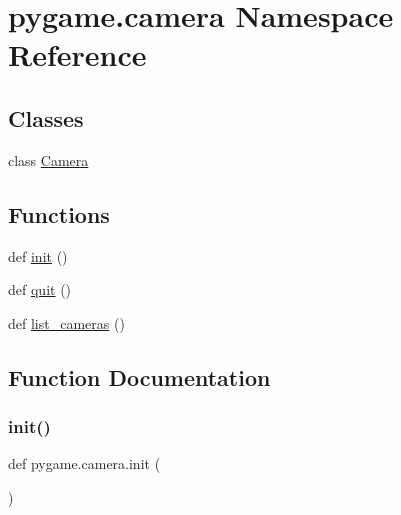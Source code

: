 \hypertarget{namespacepygame_1_1camera}{}\section{pygame.\+camera Namespace Reference}
\label{namespacepygame_1_1camera}
\subsection*{Classes}
\begin{DoxyCompactItemize}
\item 
class \hyperlink{classpygame_1_1camera_1_1_camera}{Camera}
\end{DoxyCompactItemize}
\subsection*{Functions}
\begin{DoxyCompactItemize}
\item 
def \hyperlink{namespacepygame_1_1camera_a3752238e984dca15aaa76c804c986300}{init} ()
\item 
def \hyperlink{namespacepygame_1_1camera_afc39f9eaf33103f88ec2372d1733add1}{quit} ()
\item 
def \hyperlink{namespacepygame_1_1camera_a16cd4b9a65c3e3aa868f6afb7aa410d5}{list\+\_\+cameras} ()
\end{DoxyCompactItemize}


\subsection{Function Documentation}
\mbox{\label{namespacepygame_1_1camera_a3752238e984dca15aaa76c804c986300}} 
\subsubsection{\texorpdfstring{init()}{init()}}
{\footnotesize\ttfamily def pygame.\+camera.\+init (\begin{DoxyParamCaption}{ }\end{DoxyParamCaption})}

\mbox{\label{namespacepygame_1_1camera_a16cd4b9a65c3e3aa868f6afb7aa410d5}} 
